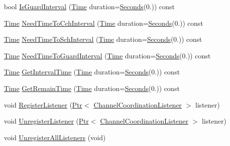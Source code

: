 \begin{DoxyCompactItemize}
\item 
bool \hyperlink{classns3_1_1ChannelCoordinator_a909edb902d2a931970d25ee33f9401c4}{Is\+Guard\+Interval} (\hyperlink{classns3_1_1Time}{Time} duration=\hyperlink{group__timecivil_ga33c34b816f8ff6628e33d5c8e9713b9e}{Seconds}(0.)) const 
\item 
\hyperlink{classns3_1_1Time}{Time} \hyperlink{classns3_1_1ChannelCoordinator_a85fb03bd1d365308506e6edad9ffd6c9}{Need\+Time\+To\+Cch\+Interval} (\hyperlink{classns3_1_1Time}{Time} duration=\hyperlink{group__timecivil_ga33c34b816f8ff6628e33d5c8e9713b9e}{Seconds}(0.)) const 
\item 
\hyperlink{classns3_1_1Time}{Time} \hyperlink{classns3_1_1ChannelCoordinator_a8e1cfa5e191ec2609b8de45ceda6d4f1}{Need\+Time\+To\+Sch\+Interval} (\hyperlink{classns3_1_1Time}{Time} duration=\hyperlink{group__timecivil_ga33c34b816f8ff6628e33d5c8e9713b9e}{Seconds}(0.)) const 
\item 
\hyperlink{classns3_1_1Time}{Time} \hyperlink{classns3_1_1ChannelCoordinator_a32a25451ffd65d72ae44678de4a08542}{Need\+Time\+To\+Guard\+Interval} (\hyperlink{classns3_1_1Time}{Time} duration=\hyperlink{group__timecivil_ga33c34b816f8ff6628e33d5c8e9713b9e}{Seconds}(0.)) const 
\item 
\hyperlink{classns3_1_1Time}{Time} \hyperlink{classns3_1_1ChannelCoordinator_afdbc02a9f0949de22c2ee13c5b5b5e16}{Get\+Interval\+Time} (\hyperlink{classns3_1_1Time}{Time} duration=\hyperlink{group__timecivil_ga33c34b816f8ff6628e33d5c8e9713b9e}{Seconds}(0.)) const 
\item 
\hyperlink{classns3_1_1Time}{Time} \hyperlink{classns3_1_1ChannelCoordinator_a56921eacde89f359138fae3b20bf24fb}{Get\+Remain\+Time} (\hyperlink{classns3_1_1Time}{Time} duration=\hyperlink{group__timecivil_ga33c34b816f8ff6628e33d5c8e9713b9e}{Seconds}(0.)) const 
\item 
void \hyperlink{classns3_1_1ChannelCoordinator_affe23981ad449a98c6349cffc690ef6c}{Register\+Listener} (\hyperlink{classns3_1_1Ptr}{Ptr}$<$ \hyperlink{classns3_1_1ChannelCoordinationListener}{Channel\+Coordination\+Listener} $>$ listener)
\item 
void \hyperlink{classns3_1_1ChannelCoordinator_abf99afc9b9c64d1210f55c170eef1f5d}{Unregister\+Listener} (\hyperlink{classns3_1_1Ptr}{Ptr}$<$ \hyperlink{classns3_1_1ChannelCoordinationListener}{Channel\+Coordination\+Listener} $>$ listener)
\item 
void \hyperlink{classns3_1_1ChannelCoordinator_a73fe11266a22f27bff7a8fbc85a0d435}{Unregister\+All\+Listeners} (void)
\end{DoxyCompactItemize}
